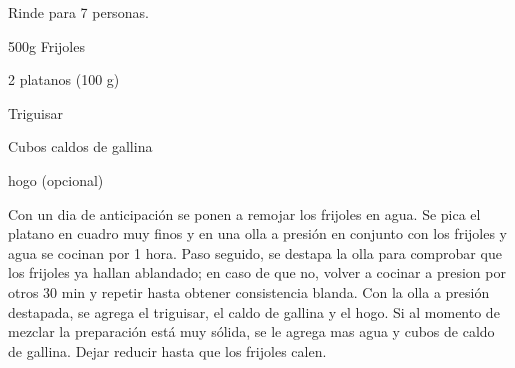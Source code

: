 
Rinde para 7 personas.

\begin{ingredientes}
\item 500g Frijoles
\item 2 platanos (100 g)
\item Triguisar
\item Cubos caldos de gallina
\item hogo (opcional)
\end{ingredientes}
\preparacion
Con un dia de anticipación se ponen a remojar los frijoles en agua. Se pica el platano en cuadro muy finos y en una olla a presión en conjunto con los frijoles y agua se cocinan por 1 hora. Paso seguido, se destapa la olla para comprobar que los frijoles ya hallan ablandado; en caso de que no, volver a cocinar a presion por otros 30 min y repetir hasta obtener consistencia blanda. Con la olla a presión destapada, se agrega el triguisar, el caldo de gallina y el hogo. Si al momento de mezclar la preparación está muy sólida, se le agrega mas agua y cubos de caldo de gallina. Dejar reducir hasta que los frijoles calen.
